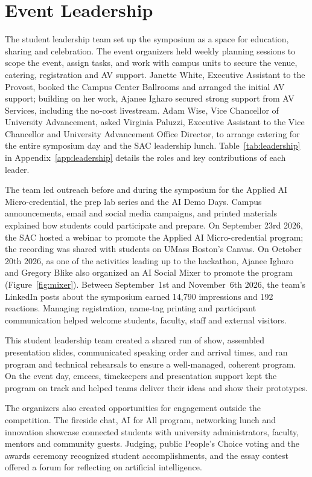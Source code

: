 \documentclass[sigconf,nonacm]{acmart}
\begin{document}
\section{Event Leadership}
The student leadership team set up the symposium as a space for education, sharing and celebration. The event organizers held weekly planning sessions to scope the event, assign tasks, and work with campus units to secure the venue, catering, registration and AV support. Janette White, Executive Assistant to the Provost, booked the Campus Center Ballrooms and arranged the initial AV support; building on her work, Ajanee Igharo secured strong support from AV Services, including the no-cost livestream. Adam Wise, Vice Chancellor of University Advancement, asked Virginia Paluzzi, Executive Assistant to the Vice Chancellor and University Advancement Office Director, to arrange catering for the entire symposium day and the SAC leadership lunch. Table~\ref{tab:leadership} in Appendix~\ref{app:leadership} details the roles and key contributions of each leader.

The team led outreach before and during the symposium for the Applied AI Micro-credential, the prep lab series and the AI Demo Days. Campus announcements, email and social media campaigns, and printed materials explained how students could participate and prepare. On September 23rd 2026, the SAC hosted a webinar to promote the Applied AI Micro-credential program; the recording was shared with students on UMass Boston's Canvas. On October 20th 2026, as one of the activities leading up to the hackathon, Ajanee Igharo and Gregory Blike also organized an AI Social Mixer to promote the program (Figure~\ref{fig:mixer}). Between September~1st and November~6th 2026, the team's LinkedIn posts about the symposium earned 14,790 impressions and 192 reactions. Managing registration, name-tag printing and participant communication helped welcome students, faculty, staff and external visitors.

This student leadership team created a shared run of show, assembled presentation slides, communicated speaking order and arrival times, and ran program and technical rehearsals to ensure a well-managed, coherent program. On the event day, emcees, timekeepers and presentation support kept the program on track and helped teams deliver their ideas and show their prototypes.

The organizers also created opportunities for engagement outside the competition. The fireside chat, AI for All program, networking lunch and innovation showcase connected students with university administrators, faculty, mentors and community guests. Judging, public People's Choice voting and the awards ceremony recognized student accomplishments, and the essay contest offered a forum for reflecting on artificial intelligence.
\end{document}
